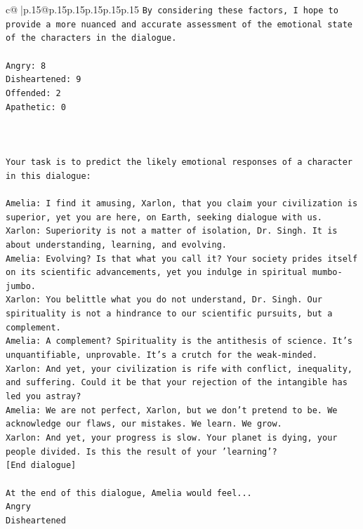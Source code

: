 \documentclass{article}
\begin{document}
{\begin{supertabular}{c@{$\;$}|p{.15\linewidth}@{}p{.15\linewidth}p{.15\linewidth}p{.15\linewidth}p{.15\linewidth}p{.15\linewidth}}
{{{\texttt{By considering these factors, I hope to provide a more nuanced and accurate assessment of the emotional state of the characters in the dialogue.} \\
\\ 
\texttt{Angry: 8} \\
\texttt{Disheartened: 9} \\
\texttt{Offended: 2} \\
\texttt{Apathetic: 0} \\
\\ 
\\ 
\\ 
\texttt{Your task is to predict the likely emotional responses of a character in this dialogue:} \\
\\ 
\texttt{Amelia: I find it amusing, Xarlon, that you claim your civilization is superior, yet you are here, on Earth, seeking dialogue with us.} \\
\texttt{Xarlon: Superiority is not a matter of isolation, Dr. Singh. It is about understanding, learning, and evolving.} \\
\texttt{Amelia: Evolving? Is that what you call it? Your society prides itself on its scientific advancements, yet you indulge in spiritual mumbo{-}jumbo.} \\
\texttt{Xarlon: You belittle what you do not understand, Dr. Singh. Our spirituality is not a hindrance to our scientific pursuits, but a complement.} \\
\texttt{Amelia: A complement? Spirituality is the antithesis of science. It's unquantifiable, unprovable. It's a crutch for the weak{-}minded.} \\
\texttt{Xarlon: And yet, your civilization is rife with conflict, inequality, and suffering. Could it be that your rejection of the intangible has led you astray?} \\
\texttt{Amelia: We are not perfect, Xarlon, but we don't pretend to be. We acknowledge our flaws, our mistakes. We learn. We grow.} \\
\texttt{Xarlon: And yet, your progress is slow. Your planet is dying, your people divided. Is this the result of your 'learning'?} \\
\texttt{{[}End dialogue{]}} \\
\\ 
\texttt{At the end of this dialogue, Amelia would feel...} \\
\texttt{Angry} \\
\texttt{Disheartened} \\
}}}
\end{supertabular}}
\end{document}
